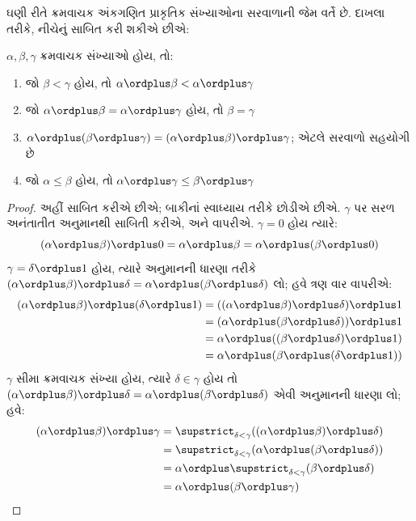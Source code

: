 ઘણી રીતે ક્રમવાચક અંકગણિત પ્રાકૃતિક સંખ્યાઓના
સરવાળાની જેમ વર્તે છે. દાખલા તરીકે, નીચેનું સાબિત
કરી શકીએ છીએ:

\begin{lem}
$\alpha, \beta, \gamma$ ક્રમવાચક સંખ્યાઓ હોય, તો:
\begin{enumerate}
	\item{} જો $\beta < \gamma$ હોય, તો $\alpha
	\ordplus  \beta < \alpha \ordplus  \gamma$
	\item{} જો $\alpha \ordplus  \beta =
	\alpha\ordplus \gamma$ હોય, તો $\beta = \gamma$
	\item{} $\alpha \ordplus  (\beta \ordplus
	\gamma) = (\alpha \ordplus  \beta) \ordplus  \gamma$;
	એટલે સરવાળો સહયોગી છે
	\item{} જો $\alpha \leq \beta$ હોય, તો $\alpha
	\ordplus  \gamma \leq \beta \ordplus \gamma$
\end{enumerate}
\end{lem}

\begin{proof}
અહીં  સાબિત કરીએ છીએ; બાકીનાં
સ્વાધ્યાય તરીકે છોડીએ છીએ. $\gamma$ પર સરળ
અનંતાતીત અનુમાનથી સાબિતી કરીએ, અને
 વાપરીએ. $\gamma = 0$
હોય ત્યારે:
\[
(\alpha \ordplus  \beta) \ordplus  0 = \alpha \ordplus  \beta  = \alpha \ordplus  (\beta \ordplus  0)
\]
$\gamma = \delta\ordplus 1$ હોય, ત્યારે અનુમાનની
ધારણા તરીકે $(\alpha
\ordplus  \beta) \ordplus  \delta = \alpha \ordplus  (\beta \ordplus
\delta)$ લો; હવે  ત્રણ વાર વાપરીએ:
\begin{align*}
	(\alpha \ordplus  \beta) \ordplus  (\delta \ordplus  1) & = ((\alpha \ordplus  \beta) \ordplus  \delta)\ordplus 1\\
	& = (\alpha \ordplus  (\beta \ordplus  \delta)) \ordplus  1\\
	& = \alpha \ordplus  ((\beta \ordplus  \delta)\ordplus 1)\\
	& = \alpha \ordplus  (\beta \ordplus  (\delta\ordplus 1))
\end{align*}
$\gamma$ સીમા ક્રમવાચક સંખ્યા હોય, ત્યારે
$\delta \in \gamma$ હોય તો $(\alpha \ordplus  \beta) \ordplus  \delta =
\alpha \ordplus  (\beta \ordplus  \delta)$ એવી
અનુમાનની ધારણા લો; હવે:
\begin{align*}
	(\alpha \ordplus  \beta) \ordplus  \gamma & = \supstrict_{\delta < \gamma}((\alpha \ordplus  \beta) \ordplus  \delta) \\
	&= \supstrict_{\delta < \gamma}(\alpha \ordplus  (\beta \ordplus  \delta))\\
	&= \alpha \ordplus  \supstrict_{\delta < \gamma}(\beta \ordplus  \delta)\\
	& = \alpha \ordplus  (\beta \ordplus  \gamma)
\end{align*}
\end{proof}

